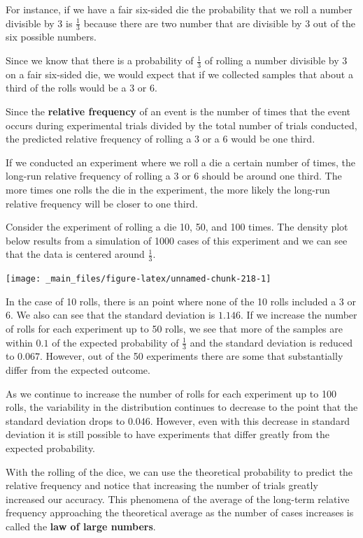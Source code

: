 \documentclass[
]{book}
\theoremstyle{definition}
\theoremstyle{definition}
\theoremstyle{definition}
\theoremstyle{definition}
\theoremstyle{remark}
\begin{document}
For instance, if we have a fair six-sided die the probability that we roll a number divisible by 3 is \(\frac{1}{3}\) because there are two number that are divisible by 3 out of the six possible numbers.

Since we know that there is a probability of \(\frac{1}{3}\) of rolling a number divisible by 3 on a fair six-sided die, we would expect that if we collected samples that about a third of the rolls would be a \(3\) or \(6\).

Since the \textbf{relative frequency} of an event is the number of times that the event occurs during experimental trials divided by the total number of trials conducted, the predicted relative frequency of rolling a \(3\) or a \(6\) would be one third.

If we conducted an experiment where we roll a die a certain number of times, the long-run relative frequency of rolling a 3 or 6 should be around one third. The more times one rolls the die in the experiment, the more likely the long-run relative frequency will be closer to one third.

Consider the experiment of rolling a die 10, 50, and 100 times. The density plot below results from a simulation of 1000 cases of this experiment and we can see that the data is centered around \(\frac{1}{3}\).

\begin{center}\texttt{[image: \_main\_files/figure-latex/unnamed-chunk-218-1]} \end{center}

In the case of 10 rolls, there is an point where none of the 10 rolls included a 3 or 6. We also can see that the standard deviation is \(1.146\). If we increase the number of rolls for each experiment up to 50 rolls, we see that more of the samples are within \(0.1\) of the expected probability of \(\frac{1}{3}\) and the standard deviation is reduced to \(0.067\). However, out of the 50 experiments there are some that substantially differ from the expected outcome.

As we continue to increase the number of rolls for each experiment up to 100 rolls, the variability in the distribution continues to decrease to the point that the standard deviation drops to \(0.046\). However, even with this decrease in standard deviation it is still possible to have experiments that differ greatly from the expected probability.

With the rolling of the dice, we can use the theoretical probability to predict the relative frequency and notice that increasing the number of trials greatly increased our accuracy. This phenomena of the average of the long-term relative frequency approaching the theoretical average as the number of cases increases is called the \textbf{law of large numbers}.
\end{document}
